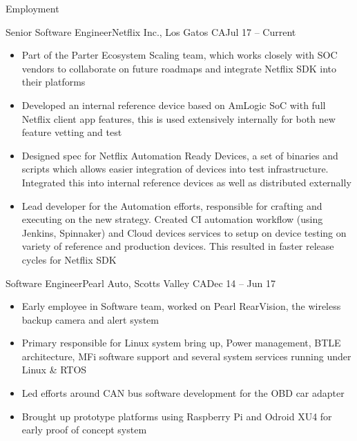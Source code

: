 \documentclass[]{mcdowellcv}
\begin{document}
	\makeheader
	
	\begin{cvsection}{Employment}
		\begin{cvsubsection}{Senior Software Engineer}{Netflix Inc., Los Gatos CA}{Jul 17 -- Current}
			\begin{itemize}
				\item Part of the Parter Ecosystem Scaling team, which works closely with SOC vendors to collaborate on future roadmaps and integrate Netflix SDK into their platforms 
				\item Developed an internal reference device based on AmLogic SoC with full Netflix client app features, this is used extensively internally for both new feature vetting and test
				\item Designed spec for Netflix Automation Ready Devices, a set of binaries and scripts which allows easier integration of devices into test infrastructure. Integrated this into internal reference devices as well as distributed externally
				\item Lead developer for the Automation efforts, responsible for crafting and executing on the new strategy. Created CI automation workflow (using Jenkins, Spinnaker) and Cloud devices services to setup on device testing on variety of reference and production devices. This resulted in faster release cycles for Netflix SDK

			\end{itemize}
		\end{cvsubsection}

		\begin{cvsubsection}{Software Engineer}{Pearl Auto, Scotts Valley CA}{Dec 14 -- Jun 17}
			\begin{itemize}
				\item Early employee in Software team, worked on Pearl RearVision, the wireless backup camera and alert system
				\item Primary responsible for Linux system bring up, Power management, BTLE architecture, MFi software support and several system services running under Linux \& RTOS
				\item Led efforts around CAN bus software development for the OBD car adapter
				\item Brought up prototype platforms using Raspberry Pi and Odroid XU4 for early proof of concept system
			\end{itemize}
		\end{cvsubsection}
		

\end{cvsection}
\end{document}
